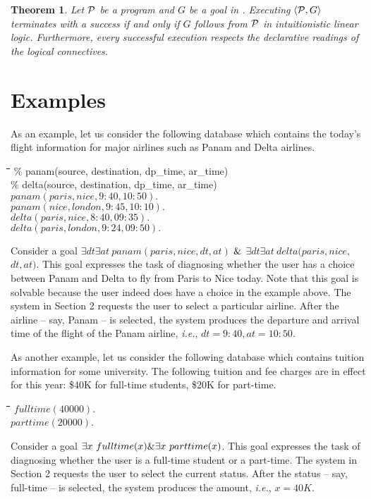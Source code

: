 \documentclass[12pt]{article}
\newcounter{lemma}
\newcommand{\Pscr}{{\cal P}}
\newcommand{\some}{\exists}
\newcommand{\ie}{{\em i.e.}}
\newenvironment{exmple}{
 \begingroup \begin{tabbing} \hspace{2em}\= \hspace{3em}\= \hspace{3em}\=
\hspace{3em}\= \hspace{3em}\= \hspace{3em}\= \kill}{
 \end{tabbing}\endgroup}
\newcommand{\lb}{\langle}
\newcommand{\rb}{\rangle}
\newtheorem{theorem}[lemma]{Theorem}
\begin{document}
\begin{theorem}
Let $\Pscr$ be a program and $G$ be a goal in \muprolog. Executing $\lb\Pscr,G\rb$ terminates
with a success if and only if $G$ follows from $\Pscr$ in  intuitionistic  linear logic.
Furthermore, every  successful execution respects the declarative readings of the logical
connectives.
\end{theorem}



\section{Examples }\label{sec:modules}


As an  example, let us consider the following database which contains the today's flight
information for major airlines such as Panam and Delta airlines.

\begin{exmple}
\% panam(source, destination, dp\_time, ar\_time) \\
\% delta(source, destination, dp\_time, ar\_time) \\
$panam(paris, nice, 9:40, 10:50).$\\
$panam(nice, london, 9:45, 10:10).$\\
$delta(paris, nice, 8:40, 09:35).$\\
$delta(paris, london, 9:24, 09:50).$\\
\end{exmple}
\noindent Consider a goal $\some dt \some at\ panam(paris,nice,dt,at)$ $\&$ $\some dt \some at\ 
delta(paris,nice,$ \\ $dt,at)$. This goal expresses the task of diagnosing whether the user has a choice between
Panam and Delta to fly from Paris to Nice today. Note that this goal is solvable because the user indeed 
does have a choice in the
example above.  The system in Section 2 requests the user to select a particular airline. After the airline -- 
 say, Panam -- is selected, the system produces the departure and arrival
time of the flight of the Panam airline, \ie, $dt = 9:40, at = 10:50$.

As another  example, let us consider the following database which contains tuition
information for some university. The following tuition and fee charges are in effect for 
this year: \$40K for full-time students, \$20K for part-time.

\begin{exmple}
$fulltime(40000)$.\\
$parttime(20000)$.\\
\end{exmple}
\noindent Consider a goal $\some x\ fulltime(x)  \adc \some x\ parttime(x)$. 
This goal expresses the task of diagnosing whether the user
is a full-time student or a part-time.   The system in Section 2  requests the user to select the current 
status.  After the status -- 
 say, full-time -- is selected, the system 
produces the amount, \ie, $x = 40K$.
\end{document}
